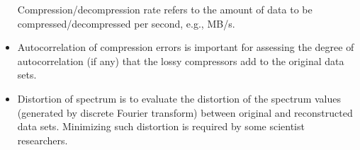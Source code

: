 \begin{itemize}
Compression/decompression rate refers to the amount of data to be compressed/decompressed per second, e.g., MB/s.
\item Autocorrelation of compression errors is important for assessing the degree of autocorrelation (if any) that the lossy compressors add to the original data sets.
\item Distortion of spectrum is to evaluate the distortion of the spectrum values (generated by discrete Fourier transform) between original and reconstructed data sets.
Minimizing such distortion is required by some scientist researchers.
\end{itemize}



